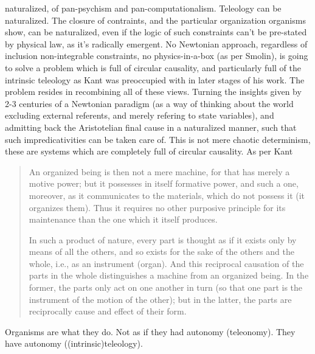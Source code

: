 \documentclass[a4paper,12pt,twoside,leqno]{article}
\begin{document}
naturalized, of pan-psychism and pan-computationalism. Teleology can be naturalized. The closure of contraints, and the particular organization organisms show, can be naturalized, even if the logic of such constraints can't be pre-stated by physical law, as it's radically emergent. No Newtonian approach, regardless of inclusion non-integrable constraints, no physics-in-a-box (as per Smolin), is going to solve a problem which is full of circular causality, and particularly full of the intrinsic teleology as Kant was preoccupied with in later stages of his work. The problem resides in recombining all of these views. Turning the insights given by 2-3 centuries of a Newtonian paradigm (as a way of thinking about the world excluding external referents, and merely refering to state variables), and admitting back the Aristotelian final cause in a naturalized manner, such that such impredicativities can be taken care of. This is not mere chaotic determinism, these are systems which are completely full of circular causality. As per Kant
\begin{quote}
An organized being is then not a mere machine, for that has merely a motive power; but it possesses in itself formative power, and such a one, moreover, as it communicates to the materials, which do not possess it (it organizes them). Thus it requires no other purposive principle for its maintenance than the one which it itself produces.

In such a product of nature, every part is thought as if it exists only by means of all the others, and so exists for the sake of the others and the whole, i.e., as an instrument (organ). And this reciprocal causation of the parts in the whole distinguishes a machine from an organized being. In the former, the parts only act on one another in turn (so that one part is the instrument of the motion of the other); but in the latter, the parts are reciprocally cause and effect of their form.
\end{quote}
Organisms are what they do. Not as if they had autonomy (teleonomy). They have autonomy ((intrinsic)teleology).\\
\end{document}
